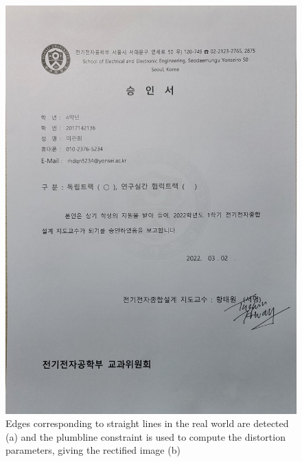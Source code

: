 \documentclass[extendedabs]{bmvc2k}
\begin{document}
\begin{figure}[t]
\includegraphics[width=\linewidth]{images/fig1.jpg}
\caption{
Edges corresponding to straight lines in the real world are
detected (a) and the plumbline constraint is used to compute the
distortion parameters, giving the rectified image (b)}
\vspace{-2mm}
\end{figure}
\end{document}
